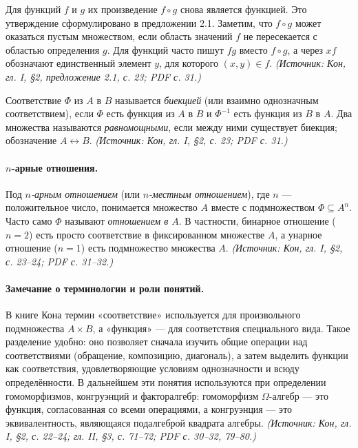\documentclass[a4paper,12pt]{article}
\begin{document}
Для функций \(f\) и \(g\) их произведение \(f\circ g\) снова является функцией. Это утверждение сформулировано в предложении 2.1. Заметим, что \(f\circ g\) может оказаться пустым множеством, если область значений \(f\) не пересекается с областью определения \(g\). Для функций часто пишут \(fg\) вместо \(f\circ g\), а через \(xf\) обозначают единственный элемент \(y\), для которого \((x,y)\in f\).
\textit{(Источник: Кон, гл. I, §2, предложение 2.1, с. 23; PDF с. 31.)}

Соответствие \(\Phi\) из \(A\) в \(B\) называется \emph{биекцией} (или взаимно однозначным соответствием), если \(\Phi\) есть функция из \(A\) в \(B\) и \(\Phi^{-1}\) есть функция из \(B\) в \(A\). Два множества называются \emph{равномощными}, если между ними существует биекция; обозначение \(A\leftrightarrow B\).
\textit{(Источник: Кон, гл. I, §2, с. 23; PDF с. 31.)}

\paragraph{\(n\)-арные отношения.}
Под \emph{\(n\)-арным отношением} (или \emph{\(n\)-местным отношением}), где \(n\) — положительное число, понимается множество \(A\) вместе с подмножеством \(\Phi\subseteq A^n\). Часто само \(\Phi\) называют \emph{отношением в \(A\)}. В частности, бинарное отношение (\(n=2\)) есть просто соответствие в фиксированном множестве \(A\), а унарное отношение (\(n=1\)) есть подмножество множества \(A\).
\textit{(Источник: Кон, гл. I, §2, с. 23--24; PDF с. 31--32.)}

\paragraph{Замечание о терминологии и роли понятий.}
В книге Кона термин «соответствие» используется для произвольного подмножества \(A\times B\), а «функция» — для соответствия специального вида. Такое разделение удобно: оно позволяет сначала изучить общие операции над соответствиями (обращение, композицию, диагональ), а затем выделить функции как соответствия, удовлетворяющие условиям однозначности и всюду определённости. В дальнейшем эти понятия используются при определении гомоморфизмов, конгруэнций и факторалгебр: гомоморфизм \(\Omega\)-алгебр — это функция, согласованная со всеми операциями, а конгруэнция — это эквивалентность, являющаяся подалгеброй квадрата алгебры.
\textit{(Источник: Кон, гл. I, §2, с. 22--24; гл. II, §3, с. 71--72; PDF с. 30--32, 79--80.)}
\end{document}
